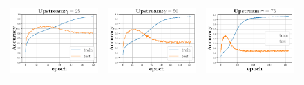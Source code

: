 \begin{figure}[h]
\begin{minipage}{0.99\columnwidth}
\begin{tabular}{ccc}
\includegraphics[scale=0.3]{figs/relu_25.pdf}&
\includegraphics[scale=0.3]{figs/relu_50.pdf}&
\includegraphics[scale=0.3]{figs/relu_75.pdf}

\end{tabular}
\end{minipage}
\end{figure}
